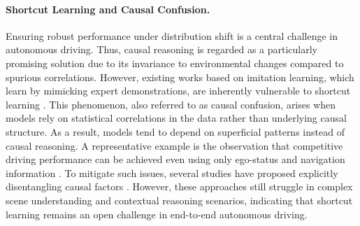 \documentclass{article}
\begin{document}
\paragraph{Shortcut Learning and Causal Confusion.}
Ensuring robust performance under distribution shift is a central challenge in autonomous driving. Thus, causal reasoning is regarded as a particularly promising solution due to its invariance to environmental changes compared to spurious correlations. However, existing works based on imitation learning, which learn by mimicking expert demonstrations, are inherently vulnerable to shortcut learning \cite{causal:e2e:causal_confusion, causal:e2e:driveadapter, causal:e2e:exploring_causality_in_e2e}. This phenomenon, also referred to as causal confusion, arises when models rely on statistical correlations in the data rather than underlying causal structure. As a result, models tend to depend on superficial patterns instead of causal reasoning. A representative example is the observation that competitive driving performance can be achieved even using only ego-status and navigation information \cite{causal:e2e:ad-mlp, e2e-ad:is-ego-status}. To mitigate such issues, several studies have proposed explicitly disentangling causal factors \cite{causal:e2e:cadet, causal:e2e:causalvad, causal:e2e:decoupling_perception_and_ego_status}. However, these approaches still struggle in complex scene understanding and contextual reasoning scenarios, indicating that shortcut learning remains an open challenge in end-to-end autonomous driving.
\end{document}
